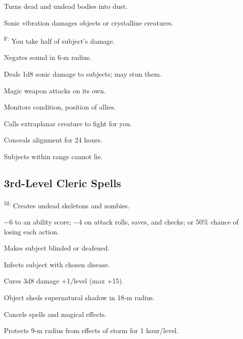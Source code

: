  Turns dead and undead bodies into dust. %

 Sonic vibration damages objects or crystalline creatures.

\textsuperscript{F:} You take half of subject's damage.

 Negates sound in 6-m radius.

 Deals 1d8 sonic damage to subjects; may stun them.

 Magic weapon attacks on its own.

 Monitors condition, position of allies.

 Calls extraplanar creature to fight for you.

 Conceals alignment for 24 hours.

 Subjects within range cannot lie.



\subsection{3rd-Level Cleric Spells}

\textsuperscript{M:} Creates undead skeletons and zombies.

 $-6$ to an ability score; $-4$ on attack rolls, saves, and checks; or 50\% chance of losing each action.

 Makes subject blinded or deafened.

 Infects subject with chosen disease.



 Cures 3d8 damage +1/level (max +15).


 Object sheds supernatural shadow in 18-m radius.

 Cancels spells and magical effects.

 Protects 9-m radius from effects of storm for 1 hour/level. %

